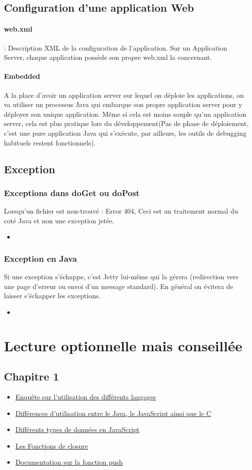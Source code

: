 \documentclass{article}[12pt]
\newcommand{\JavaScript}[2]{
	\begin{itemize}
		\item[]
	\end{itemize}
}
\begin{document}
\subsection{Configuration d'une application Web}
\paragraph{web.xml} : Description XML de la configuration de l'application. Sur un Application Server, chaque application possède son propre web.xml la concernant.
\paragraph{Embedded}
A la place d'avoir un application server sur lequel on déploie les applications, on va utiliser un processus Java qui embarque son propre application server pour y déployer son unique application. Même si cela est moins souple qu'un application server, cela est plus pratique lors du développement(Pas de phase de déploiement, c'est une pure application Java qui s'exécute, par ailleurs, les outils de debugging habituels restent fonctionnels).
\subsection{Exception}
\subsubsection{Exceptions dans doGet ou doPost}
Lorsqu'un fichier est non-trouvé : Error 404, Ceci est un traitement normal du coté Java et non une exception jetée.
\JavaScript{error404}{Gestion de l'erreur 404}
\subsubsection{Exception en Java}
Si une exception s'échappe, c'est Jetty lui-même qui la gérera (redirection vers une page d'erreur ou envoi d'un message standard). En général on évitera de laisser s'échapper les exceptions.
\JavaScript{gestion_exception}{Gestion des Exceptions}
\section{Lecture optionnelle mais conseillée}
\subsection{Chapitre 1}
\begin{itemize}
	\item \href{http://stackoverflow.com/research/developer-survey-2016}{Enquête sur l'utilisation des différents langages}
    \item \href{http://www.stefankrause.net/wp/?p=144}{Différences d'utilisation entre le Java, le JavaScript ainsi que le C}
    \item \href{http://www.w3schools.com/js/js_datatypes.asp}{Différents types de données en JavaScript}
    \item \href{http://www.w3schools.com/js/js_function_closures.asp}{Les Fonctions de closure}
	\item \href{http://www.w3schools.com/jsref/jsref_push.asp}{Documentation sur la fonction push}
\end{itemize}
\end{document}
